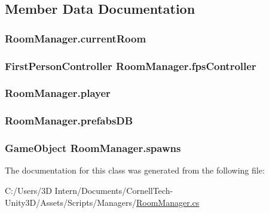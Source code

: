 \subsection{Member Data Documentation}
\subsubsection[{\texorpdfstring{current\+Room}{currentRoom}}]{ Room\+Manager.\+current\+Room}\hypertarget{class_room_manager_acfaaa02bb245fe496ad676e2e4a454bd}{}\label{class_room_manager_acfaaa02bb245fe496ad676e2e4a454bd}
\subsubsection[{\texorpdfstring{fps\+Controller}{fpsController}}]{\setlength{\rightskip}{0pt plus 5cm}First\+Person\+Controller Room\+Manager.\+fps\+Controller}\hypertarget{class_room_manager_a130b5be149bcad3ae589e79950e24a5e}{}\label{class_room_manager_a130b5be149bcad3ae589e79950e24a5e}
\subsubsection[{\texorpdfstring{player}{player}}]{ Room\+Manager.\+player}\hypertarget{class_room_manager_ac3bbfcfdd6a9ae2f1b64f2866e38cc56}{}\label{class_room_manager_ac3bbfcfdd6a9ae2f1b64f2866e38cc56}
\subsubsection[{\texorpdfstring{prefabs\+DB}{prefabsDB}}]{ Room\+Manager.\+prefabs\+DB}\hypertarget{class_room_manager_ace74869893d9f0223193af8a4e766e1b}{}\label{class_room_manager_ace74869893d9f0223193af8a4e766e1b}
\subsubsection[{\texorpdfstring{spawns}{spawns}}]{\setlength{\rightskip}{0pt plus 5cm}Game\+Object Room\+Manager.\+spawns}\hypertarget{class_room_manager_ac1df5a2a6481d53628256ad04523f123}{}\label{class_room_manager_ac1df5a2a6481d53628256ad04523f123}


The documentation for this class was generated from the following file\+:\begin{DoxyCompactItemize}
\item 
C\+:/\+Users/3\+D Intern/\+Documents/\+Cornell\+Tech-\/\+Unity3\+D/\+Assets/\+Scripts/\+Managers/\hyperlink{_room_manager_8cs}{Room\+Manager.\+cs}\end{DoxyCompactItemize}
